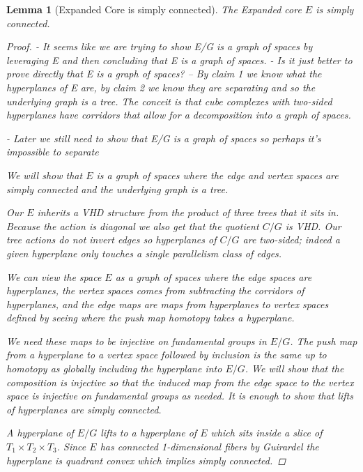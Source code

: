 \documentclass{article}
\theoremstyle{mystyle}
\newtheorem{lem}[thm]{Lemma}
\theoremstyle{remark}
\begin{document}
\begin{lem}
    [Expanded Core is simply connected]
    \label{lem:coresc} 
    The Expanded core $E$ is simply connected.
    
    \begin{proof}
    
        - It seems like we are trying to show E/G is a graph of spaces by leveraging E and then concluding that E is a graph of spaces.
        - Is it just better to prove directly that E is a graph of spaces?
        -- By claim 1 we know what the hyperplanes of E are, by claim 2 we know they are separating and so the underlying graph is a tree. The conceit is that cube complexes with two-sided hyperplanes have corridors that allow for a decomposition into a graph of spaces.
        
        - Later we still need to show that E/G is a graph of spaces so perhaps it's impossible to separate
    
        We will show that $E$ is a graph of spaces where the edge and vertex spaces are simply connected and the underlying graph is a tree.
    
        Our \(E\) inherits a VHD structure from the product of three trees that it sits in. Because the action is diagonal we also get that the quotient \(C/G\) is VHD. Our tree actions do not invert edges so hyperplanes of \(C/G\) are two-sided; indeed a given hyperplane only touches a single parallelism class of edges. 

        We can view the space $E$ as a graph of spaces where the edge spaces are hyperplanes, the vertex spaces comes from subtracting the corridors of hyperplanes, and the edge maps are maps from hyperplanes to vertex spaces defined by seeing where the push map homotopy takes a hyperplane. 
        
        We need these maps to be injective on fundamental groups in $E/G$. The push map from a hyperplane to a vertex space followed by inclusion is the same up to homotopy as globally including the hyperplane into \(E/G\). We will show that the composition is injective so that the induced map from the edge space to the vertex space is injective on fundamental groups as needed. It is enough to show that lifts of hyperplanes are simply connected.
    
        A hyperplane of $E/G$ lifts to a hyperplane of $E$ which sits inside a slice of $T_1 \times T_2\times T_3$. Since $E$ has connected 1-dimensional fibers by Guirardel the hyperplane is quadrant convex which implies simply connected.


\end{proof}
\end{lem}
\end{document}
